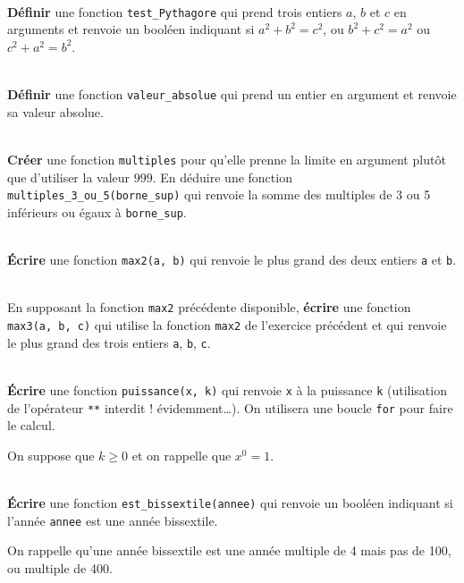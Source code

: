 \documentclass[a4paper,17pt]{extarticle}
\newenvironment{eleve}%
{\begin{activite}\color{noiramu}\\[-0.5cm]}
{\end{activite}}
\begin{document}
\begin{eleve}
    \textbf{Définir} une fonction \texttt{test\_Pythagore} qui prend trois
entiers \(a\), \(b\) et \(c\) en arguments et renvoie un booléen
indiquant si \(a^2 + b^2 = c^2\), ou \(b^2 + c^2 = a^2\) ou
\(c^2 + a^2 = b^2\).
        
        \end{eleve}\begin{eleve}
    \textbf{Définir} une fonction \texttt{valeur\_absolue} qui prend un
entier en argument et renvoie sa valeur absolue.
        
        \end{eleve}\begin{eleve}
    \textbf{Créer} une fonction \texttt{multiples} pour qu'elle prenne la
limite en argument plutôt que d'utiliser la valeur \(999\). En déduire
une fonction \texttt{multiples\_3\_ou\_5(borne\_sup)} qui renvoie la
somme des multiples de 3 ou 5 inférieurs ou égaux à \texttt{borne\_sup}.
        
        \end{eleve}\begin{eleve}
    \textbf{Écrire} une fonction \texttt{max2(a,\ b)} qui renvoie le plus
grand des deux entiers \texttt{a} et \texttt{b}.
        
        \end{eleve}\begin{eleve}
    En supposant la fonction \texttt{max2} précédente disponible,
\textbf{écrire} une fonction \texttt{max3(a,\ b,\ c)} qui utilise la
fonction \texttt{max2} de l'exercice précédent et qui renvoie le plus
grand des trois entiers \texttt{a}, \texttt{b}, \texttt{c}.
        
        \end{eleve}\begin{eleve}
    \textbf{Écrire} une fonction \texttt{puissance(x,\ k)} qui renvoie
\texttt{x} à la puissance \texttt{k} (utilisation de l'opérateur
\texttt{**} interdit ! évidemment\ldots). On utilisera une boucle
\texttt{for} pour faire le calcul.

On suppose que \(k\geq 0\) et on rappelle que \(x^0 = 1\).
        
        \end{eleve}\begin{eleve}
    \textbf{Écrire} une fonction \texttt{est\_bissextile(annee)} qui renvoie
un booléen indiquant si l'année \texttt{annee} est une année bissextile.

On rappelle qu'une année bissextile est une année multiple de 4 mais pas
de 100, ou multiple de 400.
        

\end{eleve}
\end{document}

